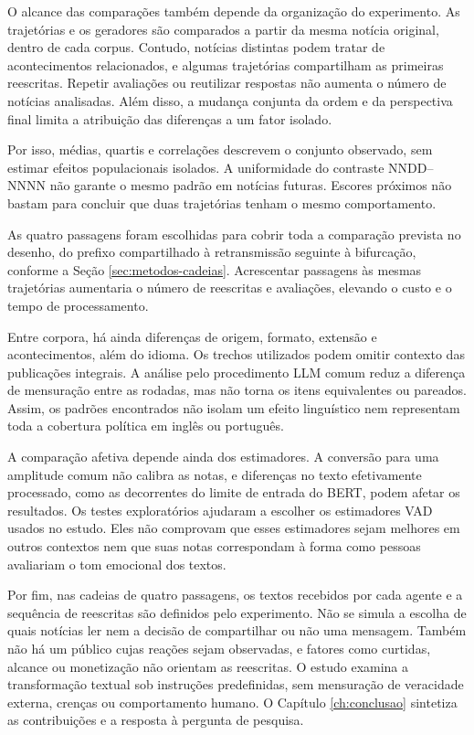 O alcance das comparações também depende da organização do experimento. As trajetórias e os geradores são comparados a partir da mesma notícia original, dentro de cada corpus. Contudo, notícias distintas podem tratar de acontecimentos relacionados, e algumas trajetórias compartilham as primeiras reescritas. Repetir avaliações ou reutilizar respostas não aumenta o número de notícias analisadas. Além disso, a mudança conjunta da ordem e da perspectiva final limita a atribuição das diferenças a um fator isolado.

Por isso, médias, quartis e correlações descrevem o conjunto observado, sem estimar efeitos populacionais isolados. A uniformidade do contraste NNDD--NNNN não garante o mesmo padrão em notícias futuras. Escores próximos não bastam para concluir que duas trajetórias tenham o mesmo comportamento.

As quatro passagens foram escolhidas para cobrir toda a comparação prevista no desenho, do prefixo compartilhado à retransmissão seguinte à bifurcação, conforme a Seção \ref{sec:metodos-cadeias}. Acrescentar passagens às mesmas trajetórias aumentaria o número de reescritas e avaliações, elevando o custo e o tempo de processamento.

Entre corpora, há ainda diferenças de origem, formato, extensão e acontecimentos, além do idioma. Os trechos utilizados podem omitir contexto das publicações integrais. A análise pelo procedimento LLM comum reduz a diferença de mensuração entre as rodadas, mas não torna os itens equivalentes ou pareados. Assim, os padrões encontrados não isolam um efeito linguístico nem representam toda a cobertura política em inglês ou português.

A comparação afetiva depende ainda dos estimadores. A conversão para uma amplitude comum não calibra as notas, e diferenças no texto efetivamente processado, como as decorrentes do limite de entrada do BERT, podem afetar os resultados. Os testes exploratórios ajudaram a escolher os estimadores VAD usados no estudo. Eles não comprovam que esses estimadores sejam melhores em outros contextos nem que suas notas correspondam à forma como pessoas avaliariam o tom emocional dos textos.

Por fim, nas cadeias de quatro passagens, os textos recebidos por cada agente e a sequência de reescritas são definidos pelo experimento. Não se simula a escolha de quais notícias ler nem a decisão de compartilhar ou não uma mensagem. Também não há um público cujas reações sejam observadas, e fatores como curtidas, alcance ou monetização não orientam as reescritas. O estudo examina a transformação textual sob instruções predefinidas, sem mensuração de veracidade externa, crenças ou comportamento humano. O Capítulo \ref{ch:conclusao} sintetiza as contribuições e a resposta à pergunta de pesquisa.
